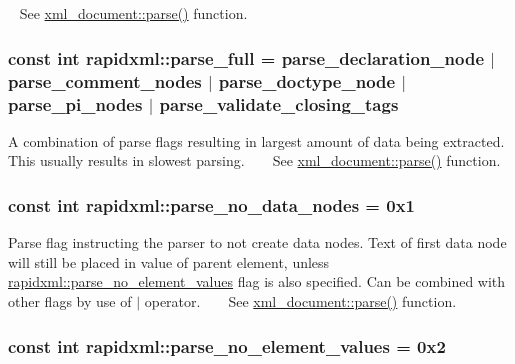 ~\newline
 See \hyperlink{singletonrapidxml_1_1xml__document_ac6e73ff9ac323bf5a370c38feb03a6b1}{xml\+\_\+document\+::parse()} function. \hypertarget{namespacerapidxml_abb48dc65db75d9e49734bc5bd2fabbfc}{
\subsubsection[{parse\+\_\+full}]{\setlength{\rightskip}{0pt plus 5cm}const int rapidxml\+::parse\+\_\+full = {\bf parse\+\_\+declaration\+\_\+node} $\vert$ {\bf parse\+\_\+comment\+\_\+nodes} $\vert$ {\bf parse\+\_\+doctype\+\_\+node} $\vert$ {\bf parse\+\_\+pi\+\_\+nodes} $\vert$ {\bf parse\+\_\+validate\+\_\+closing\+\_\+tags}}}\label{namespacerapidxml_abb48dc65db75d9e49734bc5bd2fabbfc}
A combination of parse flags resulting in largest amount of data being extracted. This usually results in slowest parsing. ~\newline
~\newline
 See \hyperlink{singletonrapidxml_1_1xml__document_ac6e73ff9ac323bf5a370c38feb03a6b1}{xml\+\_\+document\+::parse()} function. \hypertarget{namespacerapidxml_ac2d21ef14a4e8936b94aca5d38b1a74d}{
\subsubsection[{parse\+\_\+no\+\_\+data\+\_\+nodes}]{\setlength{\rightskip}{0pt plus 5cm}const int rapidxml\+::parse\+\_\+no\+\_\+data\+\_\+nodes = 0x1}}\label{namespacerapidxml_ac2d21ef14a4e8936b94aca5d38b1a74d}
Parse flag instructing the parser to not create data nodes. Text of first data node will still be placed in value of parent element, unless \hyperlink{namespacerapidxml_a00e6fea134b786ea6efeed1c8bc4a668}{rapidxml\+::parse\+\_\+no\+\_\+element\+\_\+values} flag is also specified. Can be combined with other flags by use of $\vert$ operator. ~\newline
~\newline
 See \hyperlink{singletonrapidxml_1_1xml__document_ac6e73ff9ac323bf5a370c38feb03a6b1}{xml\+\_\+document\+::parse()} function. \hypertarget{namespacerapidxml_a00e6fea134b786ea6efeed1c8bc4a668}{
\subsubsection[{parse\+\_\+no\+\_\+element\+\_\+values}]{\setlength{\rightskip}{0pt plus 5cm}const int rapidxml\+::parse\+\_\+no\+\_\+element\+\_\+values = 0x2}}\label{namespacerapidxml_a00e6fea134b786ea6efeed1c8bc4a668}
